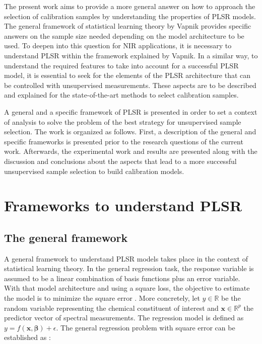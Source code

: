 \documentclass[journal=ancham,manuscript=article]{achemso}
\begin{document}
The present work aims to provide a more general answer on how to approach the selection of calibration samples by understanding the properties of PLSR models. The general framework of statistical learning theory by Vapnik provides specific answers on the sample size needed depending on the model architecture to be used\cite{Vapnik2019, Vapnik2000}. To deepen into this question for NIR applications, it is necessary to understand PLSR within the framework explained by Vapnik. In a similar way, to understand the required features to take into account for a successful PLSR model, it is essential to seek for the elements of the PLSR architecture that can be controlled with unsupervised measurements. These aspects are to be described and explained for the state-of-the-art methods to select calibration samples.

A general and a specific framework of PLSR is presented in order to set a context of analysis to solve the problem of the best strategy for unsupervised sample selection. The work is organized as follows. First, a description of the general and specific frameworks is presented prior to the research questions of the current work. Afterwards, the experimental work and results are presented along with the discussion and conclusions about the aspects that lead to a more successful unsupervised sample selection to build calibration models.


\section{Frameworks to understand PLSR}

\subsection{The general framework}

A general framework to understand PLSR models takes place in the context of statistical learning theory. In the general regression task, the response variable is assumed to be a linear combination of basis functions plus an error variable. With that model architecture and using a square loss, the objective to estimate the model is to minimize the square error \cite{Vapnik2019}. More concretely, let $y \in \mathbb{R}$ be the random variable representing the chemical constituent of interest and   $\mathbf{x} \in \mathbb{R}^{p}$ the predictor vector of spectral measurements. The regression model is defined as $ y = f(\mathbf{x}, \boldsymbol{\beta}) + \epsilon$.  The general regression problem with square error can be established as \cite{Vapnik2000}:
\end{document}
